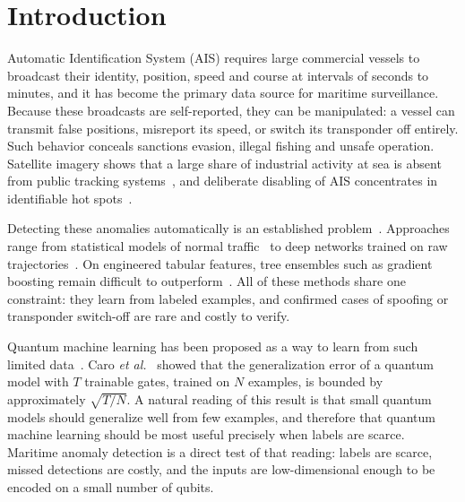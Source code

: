 \documentclass[journal]{IEEEtran}
\begin{document}
\section{Introduction}
\label{sec:intro}

 Automatic Identification System (AIS) requires large
commercial vessels to broadcast their identity, position, speed and course at
intervals of seconds to minutes, and it has become the primary data source for
maritime surveillance. Because these broadcasts are self-reported, they can be
manipulated: a vessel can transmit false positions, misreport its speed, or
switch its transponder off entirely. Such behavior conceals sanctions evasion,
illegal fishing and unsafe operation. Satellite imagery shows that a large share
of industrial activity at sea is absent from public tracking
systems~\cite{paolo2024satellite}, and deliberate disabling of AIS concentrates
in identifiable hot spots~\cite{welch2022unseen}.

Detecting these anomalies automatically is an established
problem~\cite{riveiro2018review}. Approaches range from statistical models of
normal traffic~\cite{pallotta2013tread,millefiori2016ou} to deep networks
trained on raw trajectories~\cite{kroodsma2018fisheries,nguyen2021geotracknet}.
On engineered tabular features, tree ensembles such as gradient boosting remain
difficult to outperform~\cite{grinsztajn2022trees,shwartzziv2022tabular}. All of
these methods share one constraint: they learn from labeled examples, and
confirmed cases of spoofing or transponder switch-off are rare and costly to
verify.

Quantum machine learning has been proposed as a way to learn from such limited
data~\cite{biamonte2017qml,havlicek2019supervised}. Caro
\textit{et al.}~\cite{caro2022generalization} showed that the generalization
error of a quantum model with $T$ trainable gates, trained on $N$ examples, is
bounded by approximately $\sqrt{T/N}$. A natural reading of this result is that
small quantum models should generalize well from few examples, and therefore
that quantum machine learning should be most useful precisely when labels are
scarce. Maritime anomaly detection is a direct test of that reading: labels are
scarce, missed detections are costly, and the inputs are low-dimensional enough
to be encoded on a small number of qubits.
\end{document}
